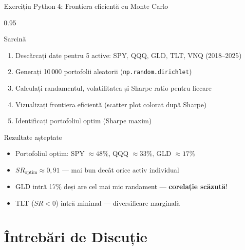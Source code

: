 \documentclass[9pt, aspectratio=169, t]{beamer}
\begin{document}
\begin{frame}[shrink=10]{Exercițiu Python 4: Frontiera eficientă cu Monte Carlo}
\begin{cminipage}{0.95\textwidth}
    \begin{block}{Sarcină}
    \begin{enumerate}\setlength{\itemsep}{0pt}
        \item Descărcați date pentru 5 active: SPY, QQQ, GLD, TLT, VNQ (2018--2025)
        \item Generați 10\,000 portofolii aleatorii (\texttt{np.random.dirichlet})
        \item Calculați randamentul, volatilitatea și Sharpe ratio pentru fiecare
        \item Vizualizați frontiera eficientă (scatter plot colorat după Sharpe)
        \item Identificați portofoliul optim (Sharpe maxim)
    \end{enumerate}
    \end{block}

    \vspace{0.2cm}
    \begin{alertblock}{Rezultate așteptate}
    \begin{itemize}\setlength{\itemsep}{0pt}
        \item Portofoliul optim: SPY $\approx 48\%$, QQQ $\approx 33\%$, GLD $\approx 17\%$
        \item $SR_{\text{optim}} \approx 0{,}91$ --- mai bun decât orice activ individual
        \item GLD intră 17\% deși are cel mai mic randament --- \textbf{corelație scăzută}!
        \item TLT ($SR < 0$) intră minimal --- diversificare marginală
    \end{itemize}
    \end{alertblock}

\end{cminipage}
\end{frame}

\section{Întrebări de Discuție}
\end{document}

